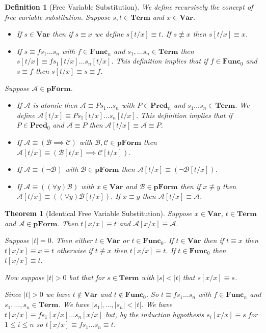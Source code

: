 \documentclass[12pt]{article}
\theoremstyle{break}
\newtheorem{definition}{Definition}[section]
\theoremstyle{break}
\newtheorem{theorem}{Theorem}[section]
\theoremstyle{break}
\theoremstyle{break}
\theoremstyle{break}
\newtheorem{informal definition}[definition]{Informal Definition}
\newcommand{\mc}[1]{\mathcal{#1}}
\begin{document}
\begin{definition}[Free Variable Substitution]
We define recursively the concept of free variable substitution.
Suppose $s, t \in \textbf{Term}$ and $x\in \textbf{Var}$.
\begin{itemize}
\item{If $s\in\textbf{Var}$ then if $s\equiv x$ we define $s[t/x] \equiv t$. If $s\not \equiv x$ then $s[t/x] \equiv x$.}
\item{If $s \equiv fs_1\ldots s_n$ with $f\in\textbf{Func}_n$ and $s_1, \ldots s_n \in \textbf{Term}$ then $s[t/x] \equiv fs_1[t/x]\ldots s_n[t/x]$. This definition implies that if $f\in \textbf{Func}_0$ and $s\equiv f$ then $s[t/x] \equiv s \equiv f$.}
\end{itemize}

Suppose $\mc{A} \in \textbf{pForm}$.
\begin{itemize}
\item{If $\mc{A}$ is atomic then $\mc{A} \equiv Ps_1\ldots s_n$ with $P\in\textbf{Pred}_n$ and $s_1\ldots s_n\in\textbf{Term}$. We define $\mc{A}[t/x] \equiv Ps_1[t/x]\ldots s_n[t/x]$. This definition implies that if $P\in\textbf{Pred}_0$ and $\mc{A}\equiv P$ then $\mc{A}[t/x] \equiv \mc{A} \equiv P$.}
\item{If $\mc{A} \equiv (\mc{B} \implies \mc{C})$ with $\mc{B}, \mc{C}\in\textbf{pForm}$ then $\mc{A}[t/x] \equiv (\mc{B}[t/x] \implies \mc{C}[t/x])$.}
\item{If $\mc{A} \equiv (\lnot \mc{B})$ with $\mc{B}\in\textbf{pForm}$ then $\mc{A}[t/x] \equiv (\lnot \mc{B}[t/x])$.}
\item{If $\mc{A} \equiv ((\forall y) \mc{B})$ with $x\in\textbf{Var}$ and $\mc{B}\in\textbf{pForm}$ then if $x\not \equiv y$ then $\mc{A}[t/x] \equiv ((\forall y) \mc{B}[t/x])$. If $x \equiv y$ then $\mc{A}[t/x] \equiv \mc{A}$.}
\end{itemize}

\end{definition}

\begin{theorem}[Identical Free Variable Substitution]
\label{thm:idenfvsub}
Suppose $x\in\textbf{Var}$, $t\in\textbf{Term}$ and $\mc{A}\in\textbf{pForm}$.
Then $t[x/x] \equiv t$ and $\mc{A}[x/x]\equiv \mc{A}$.

Suppose $|t| = 0$.
Then either $t\in \textbf{Var}$ or $t\in\textbf{Func}_0$.
If $t\in\textbf{Var}$ then if $t\equiv x$ then $t[x/x] \equiv x \equiv t$ otherwise if $t \not \equiv x$ then $t[x/x] \equiv t$.
If $t\in\textbf{Func}_0$ then $t[x/x] \equiv t$.

Now suppose $|t|>0$ but that for $s\in\textbf{Term}$ with $|s|<|t|$ that $s[x/x] \equiv s$.

Since $|t|>0$ we have $t\not \in \textbf{Var}$ and $t\not \in \textbf{Func}_0$.
So $t\equiv fs_1\ldots s_n$ with $f\in\textbf{Func}_n$ and $s_1,\ldots, s_n\in\textbf{Term}$.
We have $|s_1|,\ldots,|s_n| < |t|$.
We have $t[x/x] \equiv f s_1[x/x]\ldots s_n[x/x]$ but, by the induction hypothesis $s_i[x/x] \equiv s$ for $1\le i \le n$ so $t[x/x]\equiv fs_1\ldots s_n \equiv t$.
\end{theorem}
\end{document}
